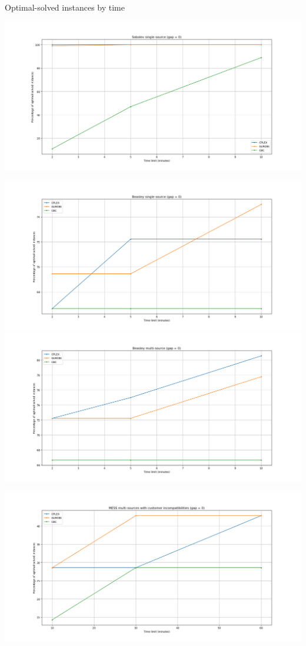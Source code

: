 \documentclass{article}
\author{}
\title{}
\date{}
\begin{document}
	
	\maketitle
	
	\begin{center}
		Optimal-solved instances by time
		
		\includegraphics[width=\textwidth]{Sobolev SS - Optimal x Time}
		
		\includegraphics[width=\textwidth]{Beasley SS - Optimal x Time}
		\includegraphics[width=\textwidth]{Beasley MS - Optimal x Time}
		
		\includegraphics[width=\textwidth]{MESS MS CI - Optimal x Time}
		

\end{center}
\end{document}
